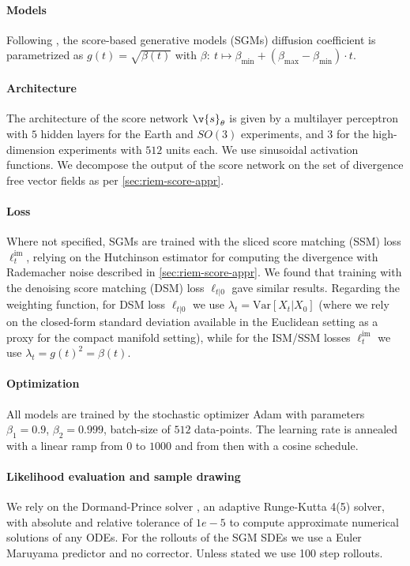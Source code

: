 \paragraph{Models}
Following \textcite{song2020score}, the score-based generative models (SGMs) diffusion coefficient is parametrized as \(g(t) = \sqrt{\beta(t)}\) with \(\beta: \ t \mapsto \beta_{\min} + (\beta_{\max} - \beta_{\min}) \cdot t\).
\paragraph{Architecture}
The architecture of the score network \(\v{s}_\theta\) is given by a multilayer perceptron with \(5\) hidden layers for the Earth and \(SO(3)\) experiments, and \(3\) for the high-dimension experiments with \(512\) units each.
We use sinusoidal activation functions.
We decompose the output of the score network on the set of divergence free vector fields as per \cref{sec:riem-score-appr}.

\paragraph{Loss}
Where not specified, SGMs are trained with the sliced score matching (SSM) loss \(\ell^{\mathrm{im}}_t\), relying on the Hutchinson estimator for computing the divergence with Rademacher noise described in \cref{sec:riem-score-appr}.
We found that training with the denoising score matching (DSM) loss \(\ell_{t|0}\) gave similar results.
Regarding the weighting function, for DSM loss \(\ell_{t|0}\) we use \(\lambda_t = \text{Var}[X_t|X_0]\) (where we rely on the closed-form standard deviation available in the Euclidean setting as a proxy for the compact manifold setting), while for the ISM/SSM losses \(\ell^{\mathrm{im}}_t\) we use \(\lambda_t = g(t)^2 = \beta(t)\).

\paragraph{Optimization}
All models are trained by the stochastic optimizer Adam \parencite{kingma2014adam} with parameters \(\beta_1=0.9\), \(\beta_2=0.999\), batch-size of \(512\) data-points.
The learning rate is annealed with a linear ramp from \(0\) to \(1000\) and from then with a cosine schedule.

\paragraph{Likelihood evaluation and sample drawing}
We rely on the Dormand-Prince solver \parencite{dormand1980family}, an adaptive Runge-Kutta 4(5) solver, with absolute and relative tolerance of \(1e-5\) to compute approximate numerical solutions of any ODEs.
For the rollouts of the SGM SDEs we use a Euler Maruyama predictor and no corrector.
Unless stated we use 100 step rollouts.

